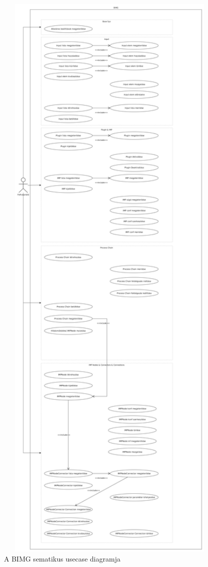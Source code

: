 \documentclass[a4paper,12pt,oneside]{report}
\begin{document}
\begin{figure}[h]
  \includegraphics[width=1\textwidth]{usecase_full.png}
  \caption{A BIMG sematikus usecase diagramja }
  \label{fig:bimg_usecase_full}
\end{figure}
\end{document}
